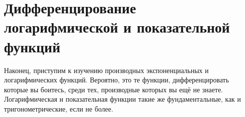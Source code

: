 ﻿\documentclass[a4paper,12pt, 3in, 4in]{article}
\begin{document}
\section*{Дифференцирование логарифмической и показательной функций}
Наконец, приступим к изучению производных экспоненциальных и логарифмических функций. Вероятно, это те функции, дифференцировать которые вы боитесь, среди тех, производные которых вы ещё не знаете. Логарифмическая и показательная функции такие же фундаментальные, как и тригонометрические, если не более.
\end{document}
